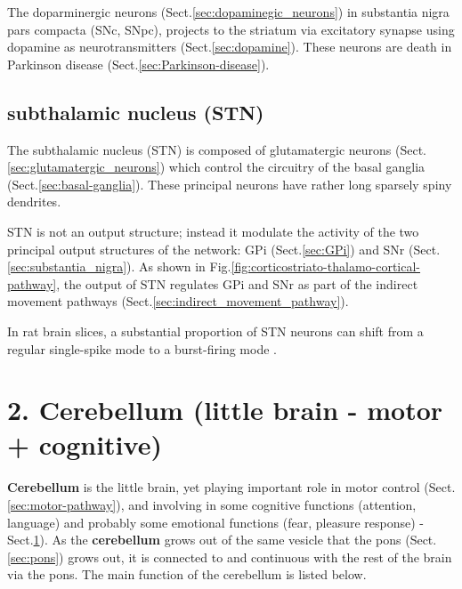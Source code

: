 The doparminergic neurons (Sect.\ref{sec:dopaminegic_neurons}) in substantia
nigra pars compacta (SNc, SNpc), projects to the striatum via excitatory synapse
using dopamine as neurotransmitters (Sect.\ref{sec:dopamine}).
These neurons are death in Parkinson disease (Sect.\ref{sec:Parkinson-disease}).

\subsection{subthalamic nucleus (STN)}
\label{sec:STN}
\label{sec:subthalamic_nucleus-neurons}

The subthalamic nucleus (STN) is composed of glutamatergic
neurons (Sect.\ref{sec:glutamatergic_neurons}) which control the circuitry of
the basal ganglia (Sect.\ref{sec:basal-ganglia}). These principal neurons have
rather long sparsely spiny dendrites.
 

STN is not an output structure; instead it modulate the activity of the two
principal output structures of the network: GPi (Sect.\ref{sec:GPi}) and SNr
(Sect.\ref{sec:substantia_nigra}).
As shown in Fig.\ref{fig:corticostriato-thalamo-cortical-pathway}, the output of
STN regulates GPi and SNr as part of the indirect movement pathways
(Sect.\ref{sec:indirect_movement_pathway}).

In rat brain slices, a substantial proportion of STN neurons can shift from a
regular single-spike mode to a burst-firing mode \citep{beurrier1999}.



\section{2. Cerebellum (little brain - motor + cognitive)}
\label{sec:cerebellum}


{\bf Cerebellum} is the little brain, yet playing important role in motor
control (Sect.\ref{sec:motor-pathway}), and involving in some cognitive
functions (attention, language) and probably some emotional functions (fear,
pleasure response) - Sect.\ref{sec:cerebellum}). 
As the {\bf cerebellum} grows out of the same vesicle that the pons
(Sect.\ref{sec:pons}) grows out, it is connected to and continuous with the rest
of the brain via the pons. The main function of the cerebellum is listed below.

